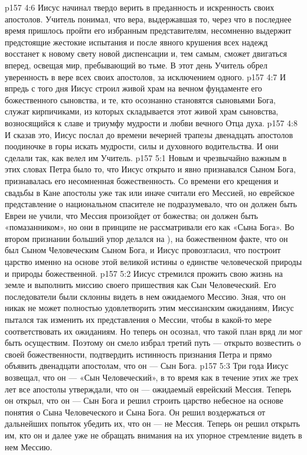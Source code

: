 \vs p157 4:6 \pc Иисус начинал твердо верить в преданность и искренность своих апостолов. Учитель понимал, что вера, выдержавшая то, через что в последнее время пришлось пройти его избранным представителям, несомненно выдержит предстоящие жестокие испытания и после явного крушения всех надежд восстанет к новому свету новой диспенсации и, тем самым, сможет двигаться вперед, освещая мир, пребывающий во тьме. В этот день Учитель обрел уверенность в вере всех своих апостолов, за исключением одного.
\vs p157 4:7 И впредь с того дня Иисус строил живой храм на вечном фундаменте его божественного сыновства, и те, кто осознанно становятся сыновьями Бога, служат кирпичиками, из которых складывается этот живой храм сыновства, возносящийся к славе и триумфу мудрости и любви вечного Отца духа.
\vs p157 4:8 \pc И сказав это, Иисус послал до времени вечерней трапезы двенадцать апостолов поодиночке в горы искать мудрости, силы и духовного водительства. И они сделали так, как велел им Учитель.
\vs p157 5:1 Новым и чрезвычайно важным в этих словах Петра было то, что Иисус открыто и явно признавался Сыном Бога, признавалась его несомненная божественность. Со времени его крещения и свадьбы в Кане апостолы уже так или иначе считали его Мессией, но еврейское представление о национальном спасителе не подразумевало, что он должен быть  Евреи не учили, что Мессия произойдет от божества; он должен быть «помазанником», но они в принципе не рассматривали его как «Сына Бога». Во втором признании больший упор делался на  ), на божественном факте, что он был Сыном Человеческим  Сыном Бога, и Иисус провозгласил, что построит царство именно на основе этой великой истины о единстве человеческой природы и природы божественной.
\vs p157 5:2 Иисус стремился прожить свою жизнь на земле и выполнить миссию своего пришествия как Сын Человеческий. Его последователи были склонны видеть в нем ожидаемого Мессию. Зная, что он никак не может полностью удовлетворить этим мессианским ожиданиям, Иисус пытался так изменить их представления о Мессии, чтобы в какой\hyp{}то мере соответствовать их ожиданиям. Но теперь он осознал, что такой план вряд ли мог быть осуществим. Поэтому он смело избрал третий путь --- открыто возвестить о своей божественности, подтвердить истинность признания Петра и прямо объявить двенадцати апостолам, что он --- Сын Бога.
\vs p157 5:3 Три года Иисус возвещал, что он --- «Сын Человеческий», в то время как в течение этих же трех лет все апостолы утверждали, что он --- ожидаемый еврейский Мессия. Теперь он открыл, что он --- Сын Бога и решил строить царство небесное на основе понятия о  Сына Человеческого и Сына Бога. Он решил воздержаться от дальнейших попыток убедить их, что он --- не Мессия. Теперь он решил открыть им, кто он  и далее уже не обращать внимания на их упорное стремление видеть в нем Мессию.
